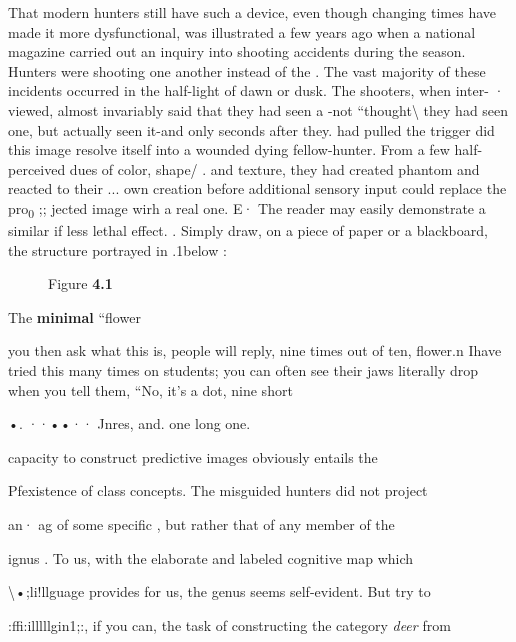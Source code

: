 That modern hunters still have such a device, even though changing times have made it more dysfunctional, was illustrated a few years ago when a national magazine carried out an inquiry into shooting accidents during the  season. Hunters were shooting one another instead of the . The vast majority of these incidents oc\-curred in the half-light of dawn or dusk. The shooters, when inter- · viewed, almost invariably said that they had seen a -not ``thought{\textquotedbl}{\textbackslash} they had seen one, but actually seen it-and only seconds after they. had pulled the trigger did this image resolve itself into a wounded
dying fellow-hunter. From a few half-perceived dues of color, shape/ . and texture, they had created phantom  and reacted to their ...
own creation before additional sensory input could replace the pro\textsubscript{0}\textsubscript{ };;
jected image wirh a real one. E·
The reader may easily demonstrate a similar if less lethal effect. .
Simply draw, on a piece of paper or a blackboard, the structure por\-trayed in .1below :

  


 
\begin{figure}
Figure \textbf{4.1}
\end{figure}

The \textbf{minimal} ``flower{\textquotedbl}


you then ask what this is, people will reply, nine times out of ten, flower.n Ihave tried this many times on students; you can often see their jaws literally drop when you tell them, ``No, it's a dot, nine short

•. ··••·· Jnres, and. one long one.{\textquotedbl}

capacity to construct predictive images obviously entails the

Pfexistence of class concepts. The misguided hunters did not project

an· ag of some specific , but rather that of any member of the

ignus . To us, with the elaborate and labeled cognitive map which

{\textbackslash}•;li!llguage provides for us, the genus  seems self-evident. But try to

:ffi:illlllgin1;:, if you can, the task of constructing the category \textit{deer} from

